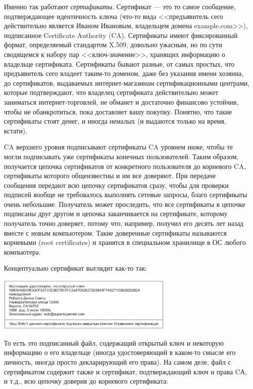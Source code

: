 \documentclass{../../text-style}
\begin{document}
Именно так работают \textit{сертификаты}. Сертификат --- это то самое сообщение, подтверждающее идентичность ключа (что-то вида <<предъявитель сего действительно является Иваном Ивановым, владельцем домена example.com>>), подписанное Certificate Authority (CA). Сертификаты имеют фиксированный формат, определяемый стандартом X.509, довольно ужасным, но по сути сводящемся к набору пар <<ключ-значение>>, хранящих информацию о владельце сертификата. Сертификаты бывают разные, от самых простых, что предъявитель сего владеет таким-то доменом, даже без указания имени хозяина, до сертификатов, выдаваемых интернет-магазинам сертификационными центрами, которые подтверждают, что владелец сертификата действительно может заниматься интернет-торговлей, не обманет и достаточно финансово устойчив, чтобы не обанкротиться, пока доставляет вашу покупку.  Понятно, что такие сертификаты стоят денег, и иногда немалых (и выдаются только на время, кстати).

CA верхнего уровня подписывают сертификаты CA уровнем ниже, чтобы те могли подписывать уже сертификаты конечных пользователей. Таким образом, получается цепочка сертификатов от конкретного пользователя до корневого CA, сертификаты которого общеизвестны и им все доверяют. При передаче сообщения передают всю цепочку сертификатов сразу, чтобы для проверки подписей вообще не требовалось выполнять сетевые запросы, благо сертификаты очень небольшие. Получатель может проследить, что все сертификаты в цепочке подписаны друг другом и цепочка заканчивается на сертификате, которому получатель точно доверяет, потому что, например, получил его десять лет назад вместе с новым компьютером. Такие доверенные сертификаты называются корневыми (root certificates) и хранятся в специальном хранилище в ОС любого компьютера.

Концептуально сертификат выглядит как-то так:

\begin{center}
    \includegraphics[width=0.65\textwidth]{certificate.png}
\end{center}

То есть это подписанный файл, содержащий открытый ключ и некоторую информацию о его владельце (иногда удостоверяющий в каком-то смысле его личность, иногда просто декларирующий его права). На самом деле, файл с сертификатом содержит также и сертификат, подтверждающий ключ и права CА, и т.д., всю цепочку доверия до корневого сертификата:
\end{document}
